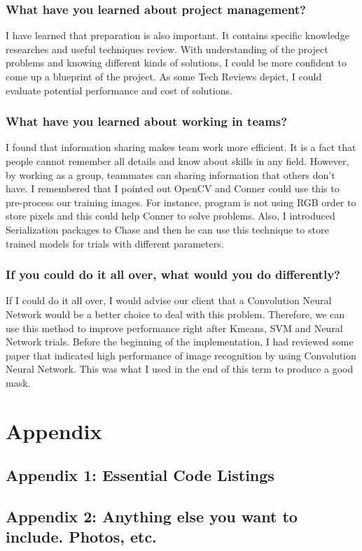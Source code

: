 \documentclass[10pt,journal,compsoc, draftclsnofoot,onecolumn]{IEEEtran}
\begin{document}
\subsubsection{What have you learned about project management?}
I have learned that preparation is also important. It contains specific knowledge researches and useful techniques review. With understanding of the project problems and knowing different kinds of solutions, I could be more confident to come up a blueprint of the project. As some Tech Reviews depict, I could evaluate potential performance and cost of solutions.

\subsubsection{What have you learned about working in teams?}
I found that information sharing makes team work more efficient. It is a fact that people cannot remember all details and know about skills in any field. However, by working as a group, teammates can sharing information that others don't have. I remembered that I pointed out OpenCV and Conner could use this to pre-process our training images. For instance, program is not using RGB order to store pixels and this could help Conner to solve problems. Also, I introduced Serialization packages to Chase and then he can use this technique to store trained models for trials with different parameters.

\subsubsection{If you could do it all over, what would you do differently?}
If I could do it all over, I would advise our client that a Convolution Neural Network would be a better choice to deal with this problem. Therefore, we can use this method to improve performance right after Kmeans, SVM and Neural Network trials. Before the beginning of the implementation, I had reviewed some paper that indicated high performance of image recognition by using Convolution Neural Network. This was what I used in the end of this term to produce a good mask.


\section{Appendix}
\subsection{Appendix 1: Essential Code Listings}
\subsection{Appendix 2: Anything else you want to include. Photos, etc.}


\newpage
\nocite{*}%


\end{document}
